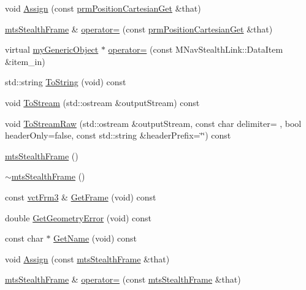 \begin{DoxyCompactItemize}
void \hyperlink{classmts_stealth_frame_ae570300bb135a8e9ab81d81e5456c552}{Assign} (const \hyperlink{classprm_position_cartesian_get}{prm\+Position\+Cartesian\+Get} \&that)
\item 
\hyperlink{classmts_stealth_frame}{mts\+Stealth\+Frame} \& \hyperlink{classmts_stealth_frame_a8350558bec876d3c65c609aecf3e2512}{operator=} (const \hyperlink{classprm_position_cartesian_get}{prm\+Position\+Cartesian\+Get} \&that)
\item 
virtual \hyperlink{classmy_generic_object}{my\+Generic\+Object} $\ast$ \hyperlink{classmts_stealth_frame_abcc4616c433c7c6fa4c3fa419c909e28}{operator=} (const M\+Nav\+Stealth\+Link\+::\+Data\+Item \&item\+\_\+in)
\item 
std\+::string \hyperlink{classmts_stealth_frame_a04cfb56c66017fc8029c81ac91655e26}{To\+String} (void) const 
\item 
void \hyperlink{classmts_stealth_frame_ac6f6690c08ffaaad27f589a7dae4da28}{To\+Stream} (std\+::ostream \&output\+Stream) const 
\item 
void \hyperlink{classmts_stealth_frame_a0b6205e28c29ccc0ba25c553bea02419}{To\+Stream\+Raw} (std\+::ostream \&output\+Stream, const char delimiter= \textquotesingle{} \textquotesingle{}, bool header\+Only=false, const std\+::string \&header\+Prefix=\char`\"{}\char`\"{}) const 
\item 
\hyperlink{classmts_stealth_frame_af32afe61af4982beef829344c6b96aea}{mts\+Stealth\+Frame} ()
\item 
\hyperlink{classmts_stealth_frame_a2ddd4401f06f843058dbfe2042dc2788}{$\sim$mts\+Stealth\+Frame} ()
\item 
const \hyperlink{vct_transformation_types_8h_a81feda0a02c2d1bc26e5553f409fed20}{vct\+Frm3} \& \hyperlink{classmts_stealth_frame_a9834fbe11a6dc5971a25d3a892620e89}{Get\+Frame} (void) const 
\item 
double \hyperlink{classmts_stealth_frame_a20ebeeaf561c90fb0be2924c02b230e3}{Get\+Geometry\+Error} (void) const 
\item 
const char $\ast$ \hyperlink{classmts_stealth_frame_ab2bdd6399b97c6558824f1feebdba73c}{Get\+Name} (void) const 
\item 
void \hyperlink{classmts_stealth_frame_a1c6b3490139cd399ae5c350cb97f8955}{Assign} (const \hyperlink{classmts_stealth_frame}{mts\+Stealth\+Frame} \&that)
\item 
\hyperlink{classmts_stealth_frame}{mts\+Stealth\+Frame} \& \hyperlink{classmts_stealth_frame_af158556b959ea14edbd87519613df304}{operator=} (const \hyperlink{classmts_stealth_frame}{mts\+Stealth\+Frame} \&that)

\end{DoxyCompactItemize}
